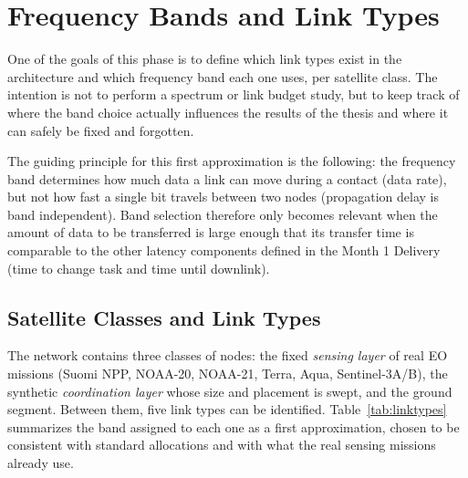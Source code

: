 \documentclass[11pt]{article}
\begin{document}
\section{Frequency Bands and Link Types} \label{sec:freqbands}

One of the goals of this phase is to define which link types exist in the architecture and which frequency band each one uses, per satellite class. The intention is not to perform a spectrum or link budget study, but to keep track of where the band choice actually influences the results of the thesis and where it can safely be fixed and forgotten.

The guiding principle for this first approximation is the following: the frequency band determines how much data a link can move during a contact (data rate), but not how fast a single bit travels between two nodes (propagation delay is band independent). Band selection therefore only becomes relevant when the amount of data to be transferred is large enough that its transfer time is comparable to the other latency components defined in the Month 1 Delivery (time to change task and time until downlink).

\subsection{Satellite Classes and Link Types}
\label{subsec:linktypes}

The network contains three classes of nodes: the fixed \emph{sensing layer} of real EO missions (Suomi NPP, NOAA-20, NOAA-21, Terra, Aqua, Sentinel-3A/B), the synthetic \emph{coordination layer} whose size and placement is swept, and the ground segment. Between them, five link types can be identified. Table~\ref{tab:linktypes} summarizes the band assigned to each one as a first approximation, chosen to be consistent with standard allocations and with what the real sensing missions already use.
\end{document}
